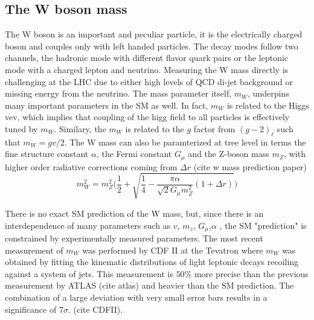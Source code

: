 

\subsection{The W boson mass}

The W boson is an important and peculiar particle, it is the electrically charged boson and couples only with left handed particles. The decay modes follow two channels, the hadronic mode with different flavor quark pairs or the leptonic mode with a charged lepton and neutrino. Measuring the W mass directly is challenging at the LHC due to either high levels of QCD di-jet background or missing energy from the neutrino. The mass parameter itself, $m_W$, underpins many important parameters in the SM as well. In fact, $m_W$ is related to the Higgs vev, which implies that coupling of the higg field to all particles is effectively tuned by $m_W$. Similary, the $m_W$ is related to the $g$ factor from $(g-2)_\ell$ such that $m_W = gv/2$. The W mass can also be paramterized at tree level in terms the fine structure constant $\alpha$, the Fermi constant $G_\mu$ and the Z-boson mass $m_Z$, with higher order radiative corrections coming from $\Delta r$  (cite w mass prediction paper)
\begin{equation}
\label{eq:mwequation}
m_W^2 = m_Z^2\Bigg(\frac{1}{2} + \sqrt{\frac{1}{4} - \frac{\pi\alpha}{\sqrt{2}G_\mu m_{Z}^2 }(1+\Delta r) } \Bigg)
\end{equation}

There is no exact SM prediction of the W mass, but, since there is an interdependence of many parameters such as $v$, $m_z$, $G_\mu$,$\alpha$ , the SM "prediction" is constrained by experimentally measured parameters. The most recent measurement of $m_W$ was performed by CDF II at the Tevatron where $m_W$ was obtained by fitting the kinematic distributions of light leptonic decays recoiling against a system of jets. This measurement is $50\%$ more precise than the previous measurement by ATLAS (cite atlas) and heavier than the SM prediction. The combination of a large deviation with very small error bars results in a significance of $7\sigma$. (cite CDFII).  

